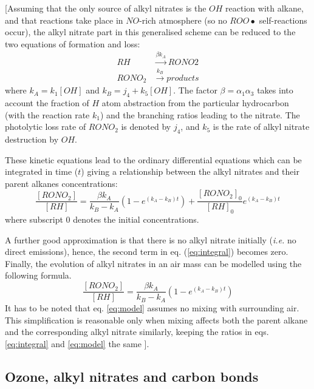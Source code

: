 \documentclass[11pt,a4paper]{article}
\begin{document}
[Assuming that the only source of alkyl nitrates is the $OH$ reaction with alkane, and that reactions take place in $NO$-rich atmosphere (so no $ROO\bullet$ self-reactions occur), the alkyl nitrate part in this generalised scheme can be reduced to the two equations of formation and loss:
\begin{subequations} \label{eq:an_form_loss0}
\begin{align}
RH &\xrightarrow{\beta k_A} RONO2 \label{eq:an_form_loss1}\\
RONO_2 &\xrightarrow{k_B} \mathit{products} \label{eq:an_form_loss2}
\end{align}
\end{subequations}
where $k_A = k_1[OH]$ and $k_B=j_4 + k_5[OH]$. The factor $\beta=\alpha_1\alpha_3$ takes into account the fraction of $H$ atom abstraction from the particular hydrocarbon (with the reaction rate $k_1$) and the branching ratios leading to the nitrate. The photolytic loss rate of $RONO_2$ is denoted by $j_4$, and $k_5$ is the rate of alkyl nitrate destruction by $OH$.

These kinetic equations lead to the ordinary differential equations which can be integrated in time ($t$) giving a relationship between the alkyl nitrates and their parent alkanes concentrations:
\begin{equation} \label{eq:integral}
\frac{[RONO_2]}{[RH]} = \frac{\beta k_A}{k_B - k_A}\left(1-e^{(k_A - k_B)t}\right)+\frac{[RONO_2]_0}{[RH]_0}e^{(k_A - k_B)t}
\end{equation}
where subscript $0$ denotes the initial concentrations.

A further good approximation is that there is no alkyl nitrate initially (\textit{i.e.} no direct emissions), hence, the second term in eq. (\eqref{eq:integral}) becomes zero. Finally, the evolution of alkyl nitrates in an air mass can be modelled using the following formula.
\begin{equation} \label{eq:model}
\frac{[RONO_2]}{[RH]} = \frac{\beta k_A}{k_B - k_A}\left(1-e^{(k_A - k_B)t}\right)
\end{equation}
It has to be noted that eq. \eqref{eq:model} assumes no mixing with surrounding air. This simplification is reasonable only when mixing affects both the parent alkane and the corresponding alkyl nitrate similarly, keeping the ratios in eqs. \eqref{eq:integral} and \eqref{eq:model} the same \citep{Reeves2007}].

\subsection{Ozone, alkyl nitrates and carbon bonds}
\end{document}
